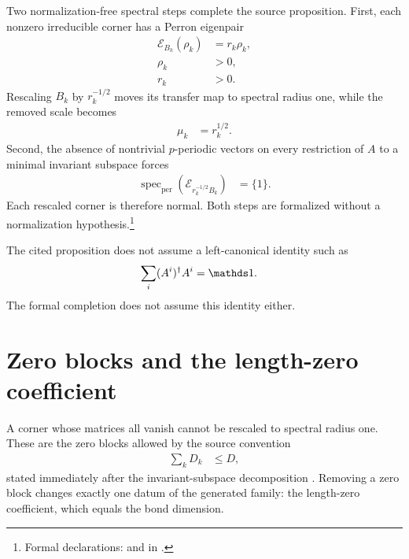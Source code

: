 \documentclass{article}
\begin{document}
Two normalization-free spectral steps complete the source proposition. First,
each nonzero irreducible corner has a Perron eigenpair
\begin{align}
    \mathcal E_{B_k}(\rho_k)
        &=r_k\rho_k,
    \label{eq:cpsv16_projector_closure_canonical_form_perron_eigenpair}\\
    \rho_k
        &>0,
    \label{eq:cpsv16_projector_closure_canonical_form_positive_perron_vector}\\
    r_k
        &>0.
    \label{eq:cpsv16_projector_closure_canonical_form_positive_spectral_radius}
\end{align}
Rescaling $B_k$ by $r_k^{-1/2}$ moves its transfer map to spectral radius one,
while the removed scale becomes
\begin{align}
    \mu_k
        &=r_k^{1/2}.
    \label{eq:cpsv16_projector_closure_canonical_form_block_weight}
\end{align}
Second, the absence of nontrivial $p$-periodic vectors on every restriction of
$A$ to a minimal invariant subspace forces
\begin{align}
    \operatorname{spec}_{\mathrm{per}}
        (\mathcal E_{r_k^{-1/2}B_k})
        &=\{1\}.
    \label{eq:cpsv16_projector_closure_canonical_form_trivial_peripheral_spectrum}
\end{align}
Each rescaled corner is therefore normal. Both steps are formalized without a
normalization hypothesis.\footnote{Formal declarations:
 and
in .}

The cited proposition does not assume a left-canonical identity such as
\begin{align}
    \sum_i(A^i)^\dagger A^i
        &=\Id.
    \label{eq:cpsv16_projector_closure_canonical_form_unassumed_normalization}
\end{align}
The formal completion does not assume this identity either.

\section{Zero blocks and the length-zero coefficient}

A corner whose matrices all vanish cannot be rescaled to spectral radius one.
These are the zero blocks allowed by the source convention
\begin{align}
    \sum_kD_k
        &\leq D,
    \label{eq:cpsv16_projector_closure_canonical_form_dimension_bound}
\end{align}
stated immediately after the invariant-subspace decomposition
\cite[line~219]{Cirac2016MPDO_arXiv}. Removing a zero block changes exactly one
datum of the generated family: the length-zero coefficient, which equals the
bond dimension.
\end{document}

